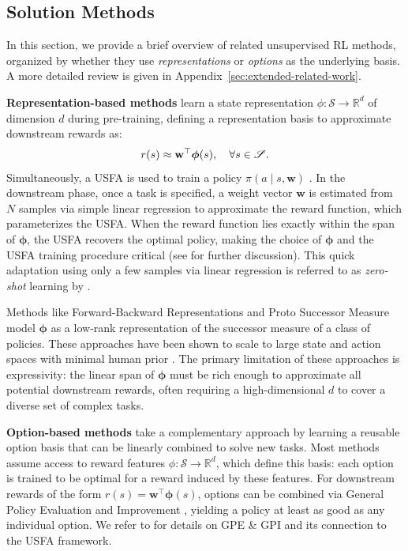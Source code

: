 \documentclass{article}
\theoremstyle{plain}
\theoremstyle{definition}
\theoremstyle{remark}
\begin{document}
\subsection{Solution Methods}

In this section, we provide a brief overview of related unsupervised RL methods, organized by whether they use \textit{representations} or \textit{options} as the underlying basis. A more detailed review is given in Appendix~\ref{sec:extended-related-work}.


\textbf{Representation-based methods} learn a state representation $\phi:\mathscr{S} \rightarrow \mathbb{R}^d$ of dimension $d$ during pre-training, defining a representation basis to approximate downstream rewards as:
\[
r(s) \approx \mathbf{w}^\top \bm{\phi}(s), \quad \forall s \in \mathscr{S}.
\]
Simultaneously, a USFA is used to train a policy $\pi(a \mid s, \mathbf{w})$ \citep{borsauniversal}. In the downstream phase, once a task is specified, a weight vector $\mathbf{w}$ is estimated from $N$ samples via simple linear regression to approximate the reward function, which parameterizes the USFA. When the reward function lies exactly within the span of $\bm{\phi}$, the USFA recovers the optimal policy, making the choice of $\bm{\phi}$ and the USFA training procedure critical (see \citet{touati2022does, borsauniversal, ollivier2025features} for further discussion). This quick adaptation using only a few samples via linear regression is referred to as \textit{zero-shot} learning by \citet{touati2022does}. 

Methods like Forward-Backward Representations \citep{touati2022does} and Proto Successor Measure \citep{agarwal2025proto} model $\bm{\phi}$ as a low-rank representation of the successor measure of a class of policies. These approaches have been shown to scale to large state and action spaces with minimal human prior \citep{tirinzonizero}. The primary limitation of these approaches is expressivity: the linear span of $\bm{\phi}$ must be rich enough to approximate all potential downstream rewards, often requiring a high-dimensional $d$ to cover a diverse set of complex tasks.


\textbf{Option-based methods} take a complementary approach by learning a reusable option basis that can be linearly combined to solve new tasks. Most methods assume access to reward features $\phi:\mathscr{S} \rightarrow \mathbb{R}^d$, which define this basis: each option is trained to be optimal for a reward induced by these features. For downstream rewards of the form $r(s)=\mathbf{w}^\top \bm{\phi}(s)$, options can be combined via General Policy Evaluation and Improvement \citep[GPE \& GPI;][]{barreto2020fast}, yielding a policy at least as good as any individual option. We refer to \citet{borsauniversal} for details on GPE \& GPI and its connection to the USFA framework. 
\end{document}
